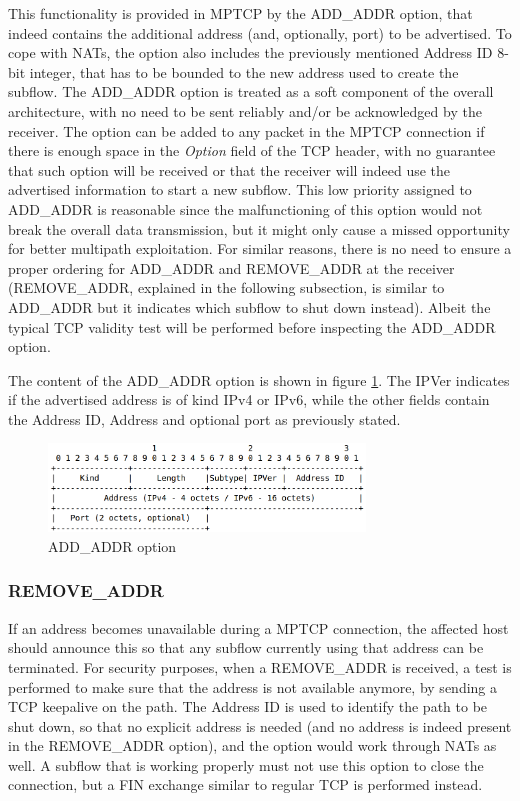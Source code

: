 This functionality is provided in MPTCP by the ADD\_ADDR option, that indeed contains the additional address (and, optionally, port) to be advertised. To cope with NATs, the option also includes the previously mentioned Address ID 8-bit integer, that has to be bounded to the new address used to create the subflow.
The ADD\_ADDR option is treated as a soft component of the overall architecture, with no need to be sent reliably and/or be acknowledged by the receiver. The option can be added to any packet in the MPTCP connection if there is enough space in the \textit{Option} field of the TCP header, with no guarantee that such option will be received or that the receiver will indeed use the advertised information to start a new subflow. This low priority assigned to ADD\_ADDR is reasonable since the malfunctioning of this option would not break the overall data transmission, but it might only cause a missed opportunity for better multipath exploitation. For similar reasons, there is no need to ensure a proper ordering for ADD\_ADDR and REMOVE\_ADDR at the receiver (REMOVE\_ADDR, explained in the following subsection, is similar to ADD\_ADDR but it indicates which subflow to shut down instead). Albeit the typical TCP validity test will be performed before inspecting the ADD\_ADDR option.

The content of the ADD\_ADDR option is shown in figure \ref{fig:addaddropt}. The IPVer indicates if the advertised address is of kind IPv4 or IPv6, while the other fields contain the Address ID, Address and optional port as previously stated.

\begin{figure}[!htb]
\centering
\includegraphics[width=0.75\textwidth]{images/addaddropt}
\caption{ADD\_ADDR option}
\label{fig:addaddropt}
\end{figure}

\subsubsection{REMOVE\_ADDR}
If an address becomes unavailable during a MPTCP connection, the affected host should announce this so that any subflow currently using that address can be terminated. For security purposes, when a REMOVE\_ADDR is received, a test is performed to make sure that the address is not available anymore, by sending a TCP keepalive on the path.
The Address ID is used to identify the path to be shut down, so that no explicit address is needed (and no address is indeed present in the REMOVE\_ADDR option), and the option would work through NATs as well. 
A subflow that is working properly must not use this option to close the connection, but a FIN exchange similar to regular TCP is performed instead.

